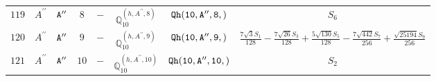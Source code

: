 \documentclass[fleqn,8pt]{jsarticle}
\begin{document}
\begin{table}[ht!]
\begin{center}
\begin{tabular}{cccccccc}
$ 119 $ & $ A^{\prime\prime} $ & $ {\tt A''} $ & $ 8 $ & $ - $ & $ \mathbb{Q}_{10}^{(h,A^{\prime\prime},8)} $ & $ {\tt Qh(10,A'',8,)} $ & $ S_{6} $ \\
$ 120 $ & $ A^{\prime\prime} $ & $ {\tt A''} $ & $ 9 $ & $ - $ & $ \mathbb{Q}_{10}^{(h,A^{\prime\prime},9)} $ & $ {\tt Qh(10,A'',9,)} $ & $ \frac{7 \sqrt{3} S_{1}}{128} - \frac{7 \sqrt{26} S_{3}}{128} + \frac{5 \sqrt{130} S_{5}}{128} - \frac{7 \sqrt{442} S_{7}}{256} + \frac{\sqrt{25194} S_{9}}{256} $ \\
$ 121 $ & $ A^{\prime\prime} $ & $ {\tt A''} $ & $ 10 $ & $ - $ & $ \mathbb{Q}_{10}^{(h,A^{\prime\prime},10)} $ & $ {\tt Qh(10,A'',10,)} $ & $ S_{2} $ \\
 \hline \hline
\end{tabular}
\end{center}
\end{table}
\end{document}
